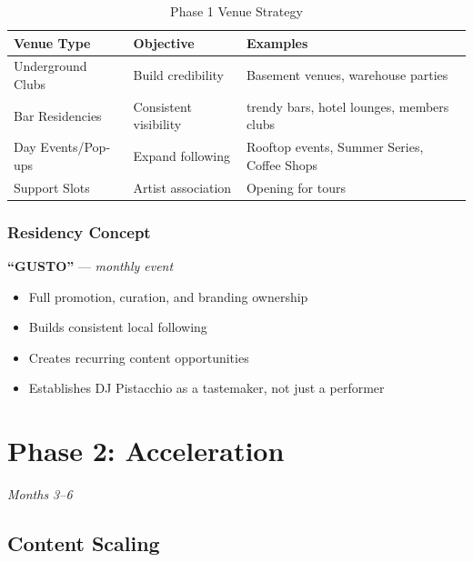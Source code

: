 \documentclass[11pt,a4paper]{article}
\begin{document}
\begin{table}[h!]
\centering
\renewcommand{\arraystretch}{1.3}
\begin{tabularx}{\textwidth}{l l X}
\toprule
\rowcolor{amaraprimary}
\textcolor{amaracream}{\textbf{Venue Type}} & \textcolor{amaracream}{\textbf{Objective}} & \textcolor{amaracream}{\textbf{Examples}} \\
\midrule
Underground Clubs & Build credibility & Basement venues, warehouse parties \\
Bar Residencies & Consistent visibility & trendy bars, hotel lounges, members clubs \\
Day Events/Pop-ups & Expand following & Rooftop events, Summer Series, Coffee Shops \\
Support Slots & Artist association & Opening for tours \\
\bottomrule
\end{tabularx}
\caption{Phase 1 Venue Strategy}
\end{table}

\subsubsection{Residency Concept}

\begin{highlightbox}
\textbf{``GUSTO''} --- \textit{monthly event}
\begin{itemize}[leftmargin=*,topsep=0pt]
    \item Full promotion, curation, and branding ownership
    \item Builds consistent local following
    \item Creates recurring content opportunities
    \item Establishes DJ Pistacchio as a tastemaker, not just a performer
\end{itemize}
\end{highlightbox}

\newpage
\section{Phase 2: Acceleration}
\textit{Months 3--6}

\subsection{Content Scaling}
\end{document}
